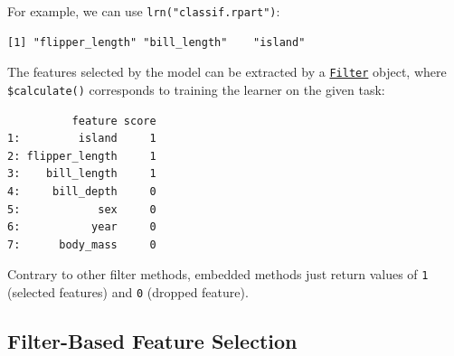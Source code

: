 For example, we can use \texttt{lrn("classif.rpart")}:

\begin{Shaded}
\begin{Highlighting}[]
\OtherTok{=} \NormalTok{(}\NormalTok{)}
\OtherTok{=} \NormalTok{(}\NormalTok{)}
\SpecialCharTok{$}
\SpecialCharTok{$}\NormalTok{()}
\end{Highlighting}
\end{Shaded}

\begin{verbatim}
[1] "flipper_length" "bill_length"    "island"        
\end{verbatim}

The features selected by the model can be extracted by a
\href{https://www.rdocumentation.org/packages/base/topics/funprog}{\texttt{Filter}}
object, where \texttt{\$calculate()} corresponds to training the learner
on the given task:

\begin{Shaded}
\begin{Highlighting}[]
\OtherTok{=} \NormalTok{(}\NormalTok{, }
\SpecialCharTok{$}
\end{Highlighting}
\end{Shaded}

\begin{verbatim}
          feature score
1:         island     1
2: flipper_length     1
3:    bill_length     1
4:     bill_depth     0
5:            sex     0
6:           year     0
7:      body_mass     0
\end{verbatim}

Contrary to other filter methods, embedded methods just return values of
\texttt{1} (selected features) and \texttt{0} (dropped feature).

\hypertarget{sec-fs-filter-based}{%
\subsection{Filter-Based Feature Selection}\label{sec-fs-filter-based}}

